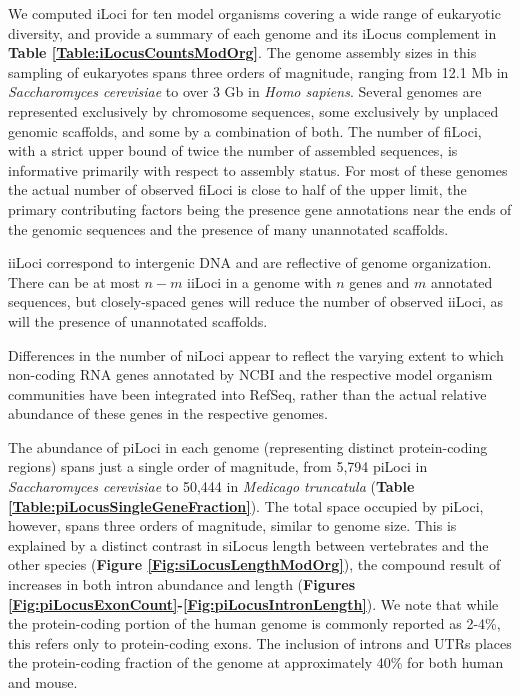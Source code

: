 We computed iLoci for ten model organisms covering a wide range of eukaryotic diversity, and provide a summary of each genome and its iLocus complement in \textbf{Table \ref{Table:iLocusCountsModOrg}}.
The genome assembly sizes in this sampling of eukaryotes spans three orders of magnitude, ranging from 12.1 Mb in \textit{Saccharomyces cerevisiae} to over 3 Gb in \textit{Homo sapiens}.
Several genomes are represented exclusively by chromosome sequences, some exclusively by unplaced genomic scaffolds, and some by a combination of both.
The number of fiLoci, with a strict upper bound of twice the number of assembled sequences, is informative primarily with respect to assembly status.
For most of these genomes the actual number of observed fiLoci is close to half of the upper limit, the primary contributing factors being the presence gene annotations near the ends of the genomic sequences and the presence of many unannotated scaffolds.

iiLoci correspond to intergenic DNA and are reflective of genome organization.
There can be at most $n-m$ iiLoci in a genome with $n$ genes and $m$ annotated sequences, but closely-spaced genes will reduce the number of observed iiLoci, as will the presence of unannotated scaffolds.

Differences in the number of niLoci appear to reflect the varying extent to which non-coding RNA genes annotated by NCBI and the respective model organism communities have been integrated into RefSeq, rather than the actual relative abundance of these genes in the respective genomes.

The abundance of piLoci in each genome (representing distinct protein-coding regions) spans just a single order of magnitude, from 5,794 piLoci in \textit{Saccharomyces cerevisiae} to 50,444 in \textit{Medicago truncatula} (\textbf{Table \ref{Table:piLocusSingleGeneFraction}}).
The total space occupied by piLoci, however, spans three orders of magnitude, similar to genome size.
This is explained by a distinct contrast in siLocus length between vertebrates and the other species (\textbf{Figure \ref{Fig:siLocusLengthModOrg}}), the compound result of increases in both intron abundance and length (\textbf{Figures \ref{Fig:piLocusExonCount}-\ref{Fig:piLocusIntronLength}}).
We note that while the protein-coding portion of the human genome is commonly reported as 2-4\%, this refers only to protein-coding exons.
The inclusion of introns and UTRs places the protein-coding fraction of the genome at approximately 40\% for both human and mouse.

